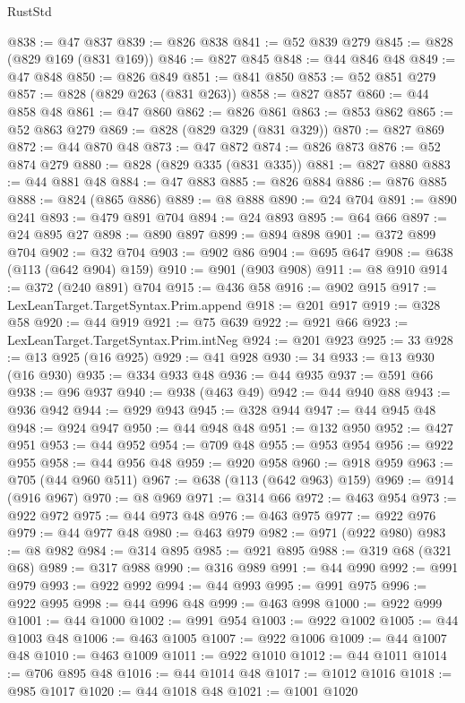 \begin{lexlean}{RustStd}
\begin{coremodule}
@838 := @47 @837
@839 := @826 @838
@841 := @52 @839 @279
@845 := @828 (@829 @169 (@831 @169))
@846 := @827 @845
@848 := @44 @846 @48
@849 := @47 @848
@850 := @826 @849
@851 := @841 @850
@853 := @52 @851 @279
@857 := @828 (@829 @263 (@831 @263))
@858 := @827 @857
@860 := @44 @858 @48
@861 := @47 @860
@862 := @826 @861
@863 := @853 @862
@865 := @52 @863 @279
@869 := @828 (@829 @329 (@831 @329))
@870 := @827 @869
@872 := @44 @870 @48
@873 := @47 @872
@874 := @826 @873
@876 := @52 @874 @279
@880 := @828 (@829 @335 (@831 @335))
@881 := @827 @880
@883 := @44 @881 @48
@884 := @47 @883
@885 := @826 @884
@886 := @876 @885
@888 := @824 (@865 @886)
@889 := @8 @888
@890 := @24 @704
@891 := @890 @241
@893 := @479 @891 @704
@894 := @24 @893
@895 := @64 @66
@897 := @24 @895 @27
@898 := @890 @897
@899 := @894 @898
@901 := @372 @899 @704
@902 := @32 @704
@903 := @902 @86
@904 := @695 @647
@908 := @638 (@113 (@642 @904) @159)
@910 := @901 (@903 @908)
@911 := @8 @910
@914 := @372 (@240 @891) @704
@915 := @436 @58
@916 := @902 @915
@917 := LexLeanTarget.TargetSyntax.Prim.append
@918 := @201 @917
@919 := @328 @58
@920 := @44 @919
@921 := @75 @639
@922 := @921 @66
@923 := LexLeanTarget.TargetSyntax.Prim.intNeg
@924 := @201 @923
@925 := 33
@928 := @13 @925 (@16 @925)
@929 := @41 @928
@930 := 34
@933 := @13 @930 (@16 @930)
@935 := @334 @933 @48
@936 := @44 @935
@937 := @591 @66
@938 := @96 @937
@940 := @938 (@463 @49)
@942 := @44 @940 @88
@943 := @936 @942
@944 := @929 @943
@945 := @328 @944
@947 := @44 @945 @48
@948 := @924 @947
@950 := @44 @948 @48
@951 := @132 @950
@952 := @427 @951
@953 := @44 @952
@954 := @709 @48
@955 := @953 @954
@956 := @922 @955
@958 := @44 @956 @48
@959 := @920 @958
@960 := @918 @959
@963 := @705 (@44 @960 @511)
@967 := @638 (@113 (@642 @963) @159)
@969 := @914 (@916 @967)
@970 := @8 @969
@971 := @314 @66
@972 := @463 @954
@973 := @922 @972
@975 := @44 @973 @48
@976 := @463 @975
@977 := @922 @976
@979 := @44 @977 @48
@980 := @463 @979
@982 := @971 (@922 @980)
@983 := @8 @982
@984 := @314 @895
@985 := @921 @895
@988 := @319 @68 (@321 @68)
@989 := @317 @988
@990 := @316 @989
@991 := @44 @990
@992 := @991 @979
@993 := @922 @992
@994 := @44 @993
@995 := @991 @975
@996 := @922 @995
@998 := @44 @996 @48
@999 := @463 @998
@1000 := @922 @999
@1001 := @44 @1000
@1002 := @991 @954
@1003 := @922 @1002
@1005 := @44 @1003 @48
@1006 := @463 @1005
@1007 := @922 @1006
@1009 := @44 @1007 @48
@1010 := @463 @1009
@1011 := @922 @1010
@1012 := @44 @1011
@1014 := @706 @895 @48
@1016 := @44 @1014 @48
@1017 := @1012 @1016
@1018 := @985 @1017
@1020 := @44 @1018 @48
@1021 := @1001 @1020

\end{coremodule}
\end{lexlean}
